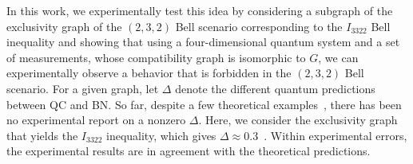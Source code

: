 \documentclass[prl,letterpaper,english,reprint,nofootinbib,aps,superscriptaddress,showpacs,showkeys]{revtex4-1}
\theoremstyle{definition}
\theoremstyle{remark}
\begin{document}
In this work, we experimentally test this idea by considering a subgraph of the exclusivity graph of the $(2,3,2)$ Bell scenario corresponding to the $I_{3322}$ Bell inequality and showing that using a four-dimensional quantum system and a set of measurements, whose compatibility graph is isomorphic to $G$, we can experimentally observe a behavior that is forbidden in the $(2,3,2)$ Bell scenario.
For a given graph, let $\Delta$ denote the different quantum predictions between QC and BN.
So far, despite a few theoretical examples~\cite{RDLTC14,SBBC13}, there has been no experimental report on a nonzero $\Delta$.
Here, we consider the exclusivity graph that yields the $I_{3322}$ inequality, which gives $\Delta\approx0.3$~\cite{RDLTC14}. Within experimental errors, the experimental results are in agreement with the theoretical predictions.

%
%
%
\end{document}
